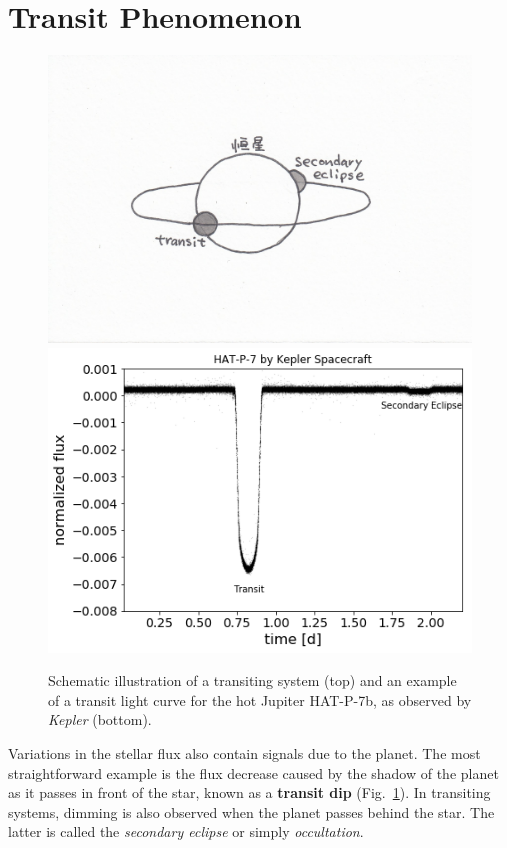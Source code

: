 \section{Transit Phenomenon \label{ss:transit}}

\begin{figure}[]
\begin{center}
	\includegraphics[width=\linewidth]{fig/transit.jpg}
	\includegraphics[width=\linewidth]{fig/Hatp7.png}
\end{center}
\caption{Schematic illustration of a transiting system (top) and an example of a transit light curve for the hot Jupiter HAT-P-7b, as observed by {\it Kepler} (bottom).\label{fig:hatp7b}}
\end{figure}

Variations in the stellar flux also contain signals due to the planet. The most straightforward example is the flux decrease caused by the shadow of the planet as it passes in front of the star, known as a {\bf transit dip} (Fig.~\ref{fig:hatp7b}). In transiting systems, dimming is also observed when the planet passes behind the star. The latter is called the \textit{secondary eclipse} or simply \textit{occultation}.  

